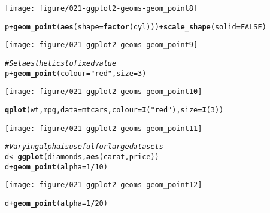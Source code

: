 \documentclass[a4paper,titlepage]{tufte-handout}\usepackage[]{graphicx}\usepackage[]{color}
\makeatletter
\def\maxwidth{ %
  \ifdim\Gin@nat@width>\linewidth
    \linewidth
  \else
    \Gin@nat@width
  \fi
}
\newcommand{\hlnum}[1]{\textcolor[rgb]{0.686,0.059,0.569}{#1}}%
\newcommand{\hlstr}[1]{\textcolor[rgb]{0.192,0.494,0.8}{#1}}%
\newcommand{\hlcom}[1]{\textcolor[rgb]{0.678,0.584,0.686}{\textit{#1}}}%
\newcommand{\hlopt}[1]{\textcolor[rgb]{0,0,0}{#1}}%
\newcommand{\hlstd}[1]{\textcolor[rgb]{0.345,0.345,0.345}{#1}}%
\newcommand{\hlkwb}[1]{\textcolor[rgb]{0.69,0.353,0.396}{#1}}%
\newcommand{\hlkwc}[1]{\textcolor[rgb]{0.333,0.667,0.333}{#1}}%
\newcommand{\hlkwd}[1]{\textcolor[rgb]{0.737,0.353,0.396}{\textbf{#1}}}%
\newenvironment{kframe}{%
 \def\at@end@of@kframe{}%
 \ifinner\ifhmode%
  \def\at@end@of@kframe{\end{minipage}}%
  \begin{minipage}{\columnwidth}%
 \fi\fi%
 \def\FrameCommand##1{\hskip\@totalleftmargin \hskip-\fboxsep
 \colorbox{shadecolor}{##1}\hskip-\fboxsep
     \hskip-\linewidth \hskip-\@totalleftmargin \hskip\columnwidth}%
 \MakeFramed {\advance\hsize-\width
   \@totalleftmargin\z@ \linewidth\hsize
   \@setminipage}}%
 {\par\unskip\endMakeFramed%
 \at@end@of@kframe}
\newenvironment{knitrout}{}{} %
\makeatother
\begin{document}
\begin{knitrout}
\begin{kframe}
{\ttfamily\noindent\itshape\color{messagecolor}{\#\# scale\_area is deprecated. Use scale\_size\_area instead.\\\#\#\ \  Note that the behavior of scale\_size\_area is slightly different:\\\#\#\ \  by default it makes the area proportional to the numeric value. (Deprecated; last used in version 0.9.2)}}\end{kframe}
\texttt{[image: figure/021-ggplot2-geoms-geom\_point8]} 
\begin{kframe}\begin{alltt}
\hlstd{p} \hlopt{+} \hlkwd{geom_point}\hlstd{(}\hlkwd{aes}\hlstd{(}\hlkwc{shape} \hlstd{=} \hlkwd{factor}\hlstd{(cyl)))} \hlopt{+} \hlkwd{scale_shape}\hlstd{(}\hlkwc{solid} \hlstd{=} \hlnum{FALSE}\hlstd{)}
\end{alltt}
\end{kframe}
\texttt{[image: figure/021-ggplot2-geoms-geom\_point9]} 
\begin{kframe}\begin{alltt}
\hlcom{# Set aesthetics to fixed value}
\hlstd{p} \hlopt{+} \hlkwd{geom_point}\hlstd{(}\hlkwc{colour} \hlstd{=} \hlstr{"red"}\hlstd{,} \hlkwc{size} \hlstd{=} \hlnum{3}\hlstd{)}
\end{alltt}
\end{kframe}
\texttt{[image: figure/021-ggplot2-geoms-geom\_point10]} 
\begin{kframe}\begin{alltt}
\hlkwd{qplot}\hlstd{(wt, mpg,} \hlkwc{data} \hlstd{= mtcars,} \hlkwc{colour} \hlstd{=} \hlkwd{I}\hlstd{(}\hlstr{"red"}\hlstd{),} \hlkwc{size} \hlstd{=} \hlkwd{I}\hlstd{(}\hlnum{3}\hlstd{))}
\end{alltt}
\end{kframe}
\texttt{[image: figure/021-ggplot2-geoms-geom\_point11]} 
\begin{kframe}\begin{alltt}
\hlcom{# Varying alpha is useful for large datasets}
\hlstd{d} \hlkwb{<-} \hlkwd{ggplot}\hlstd{(diamonds,} \hlkwd{aes}\hlstd{(carat, price))}
\hlstd{d} \hlopt{+} \hlkwd{geom_point}\hlstd{(}\hlkwc{alpha} \hlstd{=} \hlnum{1}\hlopt{/}\hlnum{10}\hlstd{)}
\end{alltt}
\end{kframe}
\texttt{[image: figure/021-ggplot2-geoms-geom\_point12]} 
\begin{kframe}\begin{alltt}
\hlstd{d} \hlopt{+} \hlkwd{geom_point}\hlstd{(}\hlkwc{alpha} \hlstd{=} \hlnum{1}\hlopt{/}\hlnum{20}\hlstd{)}

\end{alltt}
\end{kframe}
\end{knitrout}
\end{document}
